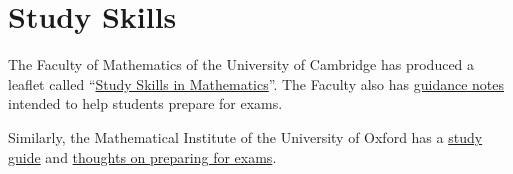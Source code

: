 \section*{Study Skills}
The Faculty of Mathematics of the University of Cambridge has produced a leaflet called ``\href{https://www.maths.cam.ac.uk/undergrad/files/studyskills.pdf}{Study Skills in Mathematics}''. The Faculty also has \href{https://www.maths.cam.ac.uk/undergrad/files/Advice%20on%20Preparing%20for%20Exams%202022.pdf}{guidance notes} intended to help students prepare for exams.

Similarly, the Mathematical Institute of the University of Oxford has a \href{https://www.maths.ox.ac.uk/system/files/attachments/study_public_0.pdf}{study guide} and \href{https://www.maths.ox.ac.uk/system/files/attachments/Revision_advice_final_0.pdf}{thoughts on preparing for exams}.